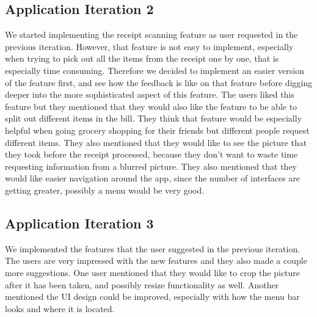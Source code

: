 \documentclass[a4wide, 10pt]{article}
\begin{document}


\subsection{Application Iteration 2}

We started implementing the receipt scanning feature as user requested in the previous iteration. However, that feature is not easy to implement, especially when trying to pick out all the items from the receipt one by one, that is especially time consuming. Therefore we decided to implement an easier version of the feature first, and see how the feedback is like on that feature before digging deeper into the more sophisticated aspect of this feature. The users liked this feature but they mentioned that they would also like the feature to be able to split out different items in the bill. They think that feature would be especially helpful when going grocery shopping for their friends but different people request different items. They also mentioned that they would like to see the picture that they took before the receipt processed, because they don't want to waste time requesting information from a blurred picture. They also mentioned that they would like easier navigation around the app, since the number of interfaces are getting greater, possibly a menu would be very good.


\subsection{Application Iteration 3}
We implemented the features that the user suggested in the previous iteration. The users are very impressed with the new features and they also made a couple more suggestions. One user mentioned that they would like to crop the picture after it has been taken, and possibly resize functionality as well. Another mentioned the UI design could be improved, especially with how the menu bar looks and where it is located.

\end{document}
